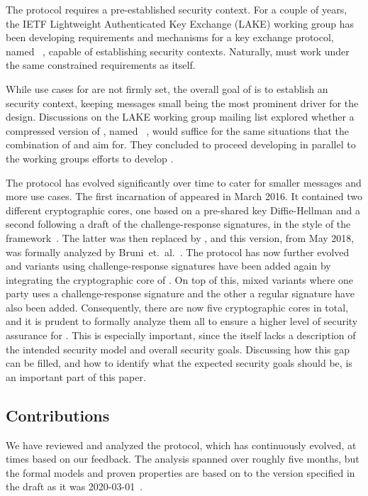 \documentclass[runningheads,draft,x11names]{llncs}
\begin{document}
The \mOscore{} protocol requires a pre-established security context.
%
For a couple of years, the IETF Lightweight Authenticated Key Exchange (LAKE)
working group has been developing requirements and mechanisms for a key
exchange protocol, named \mEdhoc~\cite{selander-lake-edhoc-01}, capable of
establishing \mOscore{} security contexts.
%
Naturally, \mEdhoc{} must work under the same constrained requirements as
\mOscore{} itself.
%

While use cases for \mEdhoc{} are not firmly set,
the overall goal of \mEdhoc{} is to establish an \mOscore{} security
context, keeping messages small being the most prominent driver for the
design.
%
Discussions on the LAKE working group mailing list explored whether a
compressed version of \mTls, named \mCtls~\cite{ietf-tls-ctls-00}, would suffice
for the same situations that
the combination of \mOscore{} and \mEdhoc{} aim for.
%
They concluded to proceed developing \mEdhoc{} in parallel to the \mTls{}
working groups efforts to develop \mCtls.
%

The \mEdhoc{} protocol has evolved significantly over time to cater for smaller
messages and more use cases.
%
The first incarnation of \mEdhoc{} appeared in March 2016.
%
It contained two different cryptographic cores, one based on a
pre-shared key Diffie-Hellman and a second following a draft of the
challenge-response signatures, in the style of the \mNoise{}
framework~\cite{perrin2016noise}.
%
The latter was then replaced by \mSigma, and this version, from May 2018, was
formally analyzed by Bruni~et.~al.~\cite{DBLP:conf/secsr/BruniJPS18}.
%
The protocol has now further evolved and variants using challenge-response
signatures have been added again by integrating the cryptographic core of
\mOptls{}.
%
On top of this, mixed variants where one party uses a challenge-response
signature and the other a regular signature have also been added.
%
Consequently, there are now five cryptographic cores in total, and it is prudent
to formally analyze them all to ensure a higher level of security assurance for
\mEdhoc.
%
This is especially important, since the \mSpec{} itself lacks a description
of the intended security model and overall security goals.
%
Discussing how this gap can be filled, and how to identify what the expected
security goals should be, is an important part of this paper.
%

\subsection{Contributions}
\label{sec:contributions}
We have reviewed and analyzed the \mEdhoc{} protocol, which has continuously
evolved, at times based on our feedback.
%
The analysis spanned over roughly five months, but the formal models and proven
properties are based on to the version specified in the draft as it was
2020-03-01~\cite{selander-lake-edhoc-01}.
%
\end{document}
